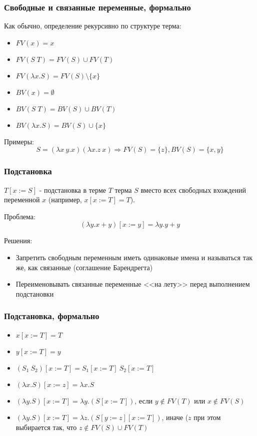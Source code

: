 \documentclass[xetex,mathserif,serif]{beamer}
\begin{document}
    \begin{frame}
        \frametitle{Свободные и связанные переменные, формально}
        Как обычно, определение рекурсивно по структуре терма:
        \begin{itemize}
            \item $FV(x) = x$
            \item $FV(S \; T) = FV(S) \cup FV(T)$
            \item $FV(\lambda x.S) = FV(S) \setminus \{x\}$
        \end{itemize}

        \begin{itemize}
            \item $BV(x) = \emptyset$
            \item $BV(S \; T) = BV(S) \cup BV(T)$
            \item $BV(\lambda x.S) = BV(S) \cup \{x\}$
        \end{itemize}
        Примеры:
        $$S = (\lambda x\ y.x) (\lambda x.z\ x) \Rightarrow FV(S) = \{z\}, BV(S) = \{x,y\}$$
    \end{frame}
    
    \begin{frame}
        \frametitle{Подстановка}
        $T[x := S]$ - подстановка в терме $T$ терма $S$ вместо всех свободных вхождений 
        переменной $x$ (например, $x[x := T] = T$).
        
        Проблема:
        $$(\lambda y.x + y)[x := y] = \lambda y. y + y$$
        
        Решения:
        \begin{itemize}
            \item Запретить свободным переменным иметь одинаковые имена и называться так же, 
                    как связанные (соглашение Барендрегта)
            \item Переименовывать связанные переменные <<на лету>> перед выполнением подстановки
        \end{itemize}
    \end{frame}
    
    \begin{frame}
        \frametitle{Подстановка, формально}
        \begin{itemize}
            \item $x[x := T] = T$
            \item $y[x := T] = y$
            \item $(S_1\ S_2)[x := T] = S_1[x := T]\ S_2[x := T]$
            \item $(\lambda x.S)[x := z] = \lambda x.S$
            \item $(\lambda y.S)[x := T] = \lambda y.(S[x := T])$, если $y \notin FV(T)$ или $x \notin FV(S)$
            \item $(\lambda y.S)[x := T] = \lambda z.(S[y := z][x := T])$, иначе ($z$ при этом выбирается так, 
                    что $z \notin FV(S) \cup FV(T)$
        \end{itemize}
    \end{frame}
        
\end{document}

